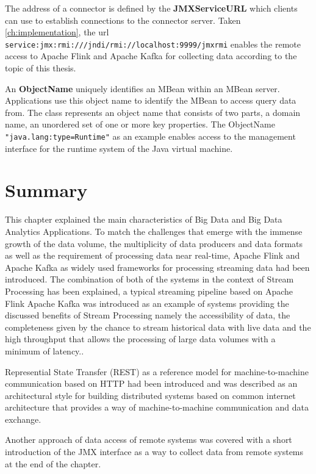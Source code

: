 The address of a connector is defined by the \textbf{JMXServiceURL} which clients can use to establish connections
to the connector server. Taken \autoref{ch:implementation}, the url \verb|service:jmx:rmi:///jndi/rmi://localhost:9999/jmxrmi|
enables the remote access to Apache Flink and Apache Kafka for collecting data according to the topic of this thesis.

An \textbf{ObjectName} uniquely identifies an MBean within an MBean server. Applications use this object name to identify
the MBean to access query data from. The class represents an object name that consists of two parts,
a domain name, an unordered set of one or more key properties. The ObjectName \verb|"java.lang:type=Runtime"|
as an example enables access to the management interface for the runtime system of the Java virtual machine.

\section{Summary}

This chapter explained the main characteristics of Big Data and Big Data Analytics Applications.
To match the challenges that emerge with the immense growth of the data volume, the multiplicity of data producers and
data formats as well as the requirement of processing data near real-time, Apache Flink and Apache Kafka as widely used
frameworks for processing streaming data had been introduced. The combination of both of the systems in the context of Stream Processing
has been explained, a typical streaming pipeline based on Apache Flink Apache Kafka was introduced as an example of systems
providing the discussed benefits of Stream Processing namely the accessibility of data, the completeness given by the chance to stream
historical data with live data and the high throughput that allows the processing of large data volumes with a minimum of latency..

Represential State Transfer (REST) as a reference model for machine-to-machine communication
based on HTTP had been introduced and was described as an architectural style for building distributed systems based on common
internet architecture that provides a way of machine-to-machine communication and data exchange.

Another approach of data access of remote systems was covered with a short introduction of the JMX interface as a way to collect
data from remote systems at the end of the chapter.

